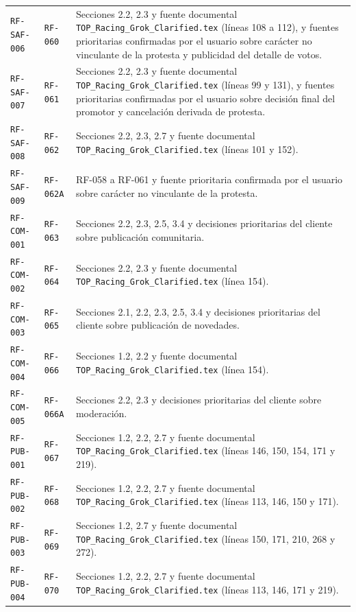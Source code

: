 \documentclass[10pt,letterpaper]{article}
\begin{document}
\begin{landscape}
\begin{longtable}{P{2.7cm}P{2.6cm}P{15.7cm}}
\texttt{RF-SAF-006} & \texttt{RF-060} & Secciones 2.2, 2.3 y fuente documental \texttt{TOP\_Racing\_Grok\_Clarified.tex} (líneas 108 a 112), y fuentes prioritarias confirmadas por el usuario sobre carácter no vinculante de la protesta y publicidad del detalle de votos.\\
\texttt{RF-SAF-007} & \texttt{RF-061} & Secciones 2.2, 2.3 y fuente documental \texttt{TOP\_Racing\_Grok\_Clarified.tex} (líneas 99 y 131), y fuentes prioritarias confirmadas por el usuario sobre decisión final del promotor y cancelación derivada de protesta.\\
\texttt{RF-SAF-008} & \texttt{RF-062} & Secciones 2.2, 2.3, 2.7 y fuente documental \texttt{TOP\_Racing\_Grok\_Clarified.tex} (líneas 101 y 152).\\
\texttt{RF-SAF-009} & \texttt{RF-062A} & RF-058 a RF-061 y fuente prioritaria confirmada por el usuario sobre carácter no vinculante de la protesta.\\
\texttt{RF-COM-001} & \texttt{RF-063} & Secciones 2.2, 2.3, 2.5, 3.4 y decisiones prioritarias del cliente sobre publicación comunitaria.\\
\texttt{RF-COM-002} & \texttt{RF-064} & Secciones 2.2, 2.3 y fuente documental \texttt{TOP\_Racing\_Grok\_Clarified.tex} (línea 154).\\
\texttt{RF-COM-003} & \texttt{RF-065} & Secciones 2.1, 2.2, 2.3, 2.5, 3.4 y decisiones prioritarias del cliente sobre publicación de novedades.\\
\texttt{RF-COM-004} & \texttt{RF-066} & Secciones 1.2, 2.2 y fuente documental \texttt{TOP\_Racing\_Grok\_Clarified.tex} (línea 154).\\
\texttt{RF-COM-005} & \texttt{RF-066A} & Secciones 2.2, 2.3 y decisiones prioritarias del cliente sobre moderación.\\
\texttt{RF-PUB-001} & \texttt{RF-067} & Secciones 1.2, 2.2, 2.7 y fuente documental \texttt{TOP\_Racing\_Grok\_Clarified.tex} (líneas 146, 150, 154, 171 y 219).\\
\texttt{RF-PUB-002} & \texttt{RF-068} & Secciones 1.2, 2.2, 2.7 y fuente documental \texttt{TOP\_Racing\_Grok\_Clarified.tex} (líneas 113, 146, 150 y 171).\\
\texttt{RF-PUB-003} & \texttt{RF-069} & Secciones 1.2, 2.7 y fuente documental \texttt{TOP\_Racing\_Grok\_Clarified.tex} (líneas 150, 171, 210, 268 y 272).\\
\texttt{RF-PUB-004} & \texttt{RF-070} & Secciones 1.2, 2.2, 2.7 y fuente documental \texttt{TOP\_Racing\_Grok\_Clarified.tex} (líneas 113, 146, 171 y 219).\\

\end{longtable}
\end{landscape}
\end{document}
